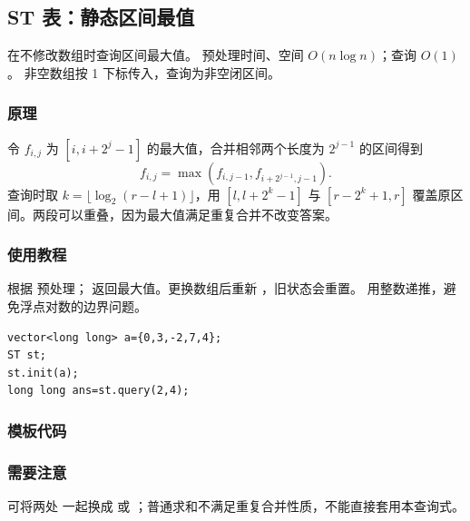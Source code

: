 \subsection{ST 表：静态区间最值}
\label{ds:st}
\AlgorithmInfo
    {在不修改数组时查询区间最大值。}
    {预处理时间、空间 $O(n\log n)$；查询 $O(1)$。}
    {非空数组按 1 下标传入，查询为非空闭区间。}
\subsubsection*{原理}
令 $f_{i,j}$ 为 $[i,i+2^j-1]$ 的最大值，合并相邻两个长度为 $2^{j-1}$ 的区间得到
\[
 f_{i,j}=\max(f_{i,j-1},f_{i+2^{j-1},j-1}).
\]
查询时取 $k=\lfloor\log_2(r-l+1)\rfloor$，用 $[l,l+2^k-1]$ 与 $[r-2^k+1,r]$ 覆盖原区间。两段可以重叠，因为最大值满足重复合并不改变答案。

\subsubsection*{使用教程}
 根据  预处理； 返回最大值。更换数组后重新 ，旧状态会重置。 用整数递推，避免浮点对数的边界问题。
\begin{lstlisting}[style=mtycpp,numbers=none]
vector<long long> a={0,3,-2,7,4};
ST st;
st.init(a);
long long ans=st.query(2,4);
\end{lstlisting}
\subsubsection*{模板代码}
\subsubsection*{需要注意}
可将两处  一起换成  或 ；普通求和不满足重复合并性质，不能直接套用本查询式。
